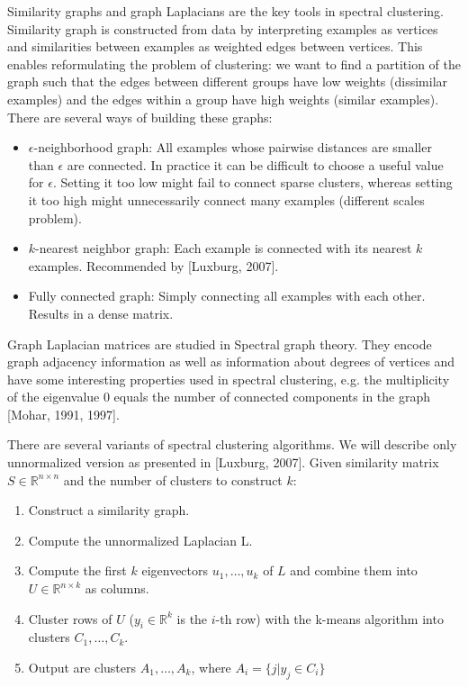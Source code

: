 \documentclass[conference]{IEEEtran}
\begin{document}
Similarity graphs and graph Laplacians are the key tools in spectral clustering.
Similarity graph is constructed from data by interpreting examples as vertices and similarities
between examples as weighted edges between vertices. This enables reformulating the problem
of clustering: we want to find a partition of the graph such that the edges between different groups
have low weights (dissimilar examples) and the edges within a group have high weights (similar examples).
There are several ways of building these graphs:
\begin{itemize}
    \item $\epsilon$-neighborhood graph: All examples whose pairwise distances are smaller than $\epsilon$
    are connected. In practice it can be difficult to choose a useful value for $\epsilon$. Setting it too
    low might fail to connect sparse clusters, whereas setting it too high might unnecessarily connect many
    examples (different scales problem).
    \item $k$-nearest neighbor graph: Each example is connected with its nearest $k$ examples. Recommended
    by [Luxburg, 2007].
    \item Fully connected graph: Simply connecting all examples with each other. Results in a dense matrix.
\end{itemize}


Graph Laplacian matrices are studied in Spectral graph theory. They encode graph adjacency information
as well as information about degrees of vertices and have some interesting properties used in spectral
clustering, e.g. the multiplicity of the eigenvalue 0 equals the number of connected components in the graph
[Mohar, 1991, 1997].

There are several variants of spectral clustering algorithms. We will describe only unnormalized version
as presented in [Luxburg, 2007]. Given similarity matrix $S \in \mathbb{R}^{n \times n}$ and the number
of clusters to construct $k$:


\begin{enumerate}
    \item Construct a similarity graph.
    \item Compute the unnormalized Laplacian L.
    \item Compute the first $k$ eigenvectors $u_1, \dots, u_k$ of $L$ and combine them into
    $U \in \mathbb{R}^{n \times k}$ as columns.
    \item Cluster rows of $U$ ($y_i \in \mathbb{R}^k$ is the $i$-th row) with the k-means algorithm
    into clusters $C_1, \dots, C_k$.
    \item Output are clusters $A_1, \dots, A_k$, where $A_i = \{ j|y_j \in C_i \}$
\end{enumerate}
\end{document}

